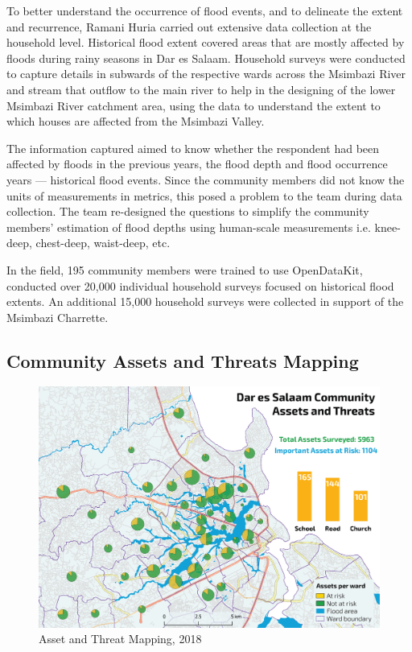 \documentclass[a4paper,12pt,twoside]{article}
\begin{document}
\begin{multicols}{2}
To better understand the occurrence of flood events, and to delineate the extent and recurrence, Ramani Huria carried out extensive data collection at the household level. Historical flood extent covered areas that are mostly affected by floods during rainy seasons in Dar es Salaam. Household surveys were conducted to capture details in subwards of the respective wards across the Msimbazi River and stream that outflow to the main river to help in the designing of the lower Msimbazi River catchment area, using the data to understand the extent to which houses are affected from the Msimbazi Valley.

The information captured aimed to know whether the respondent had been affected by floods in the previous years, the flood depth and flood occurrence years --- historical flood events. Since the community members did not know the units of measurements in metrics, this posed a problem to the team during data collection. The team re-designed the questions to simplify the community members’ estimation of flood depths using human-scale measurements i.e. knee-deep, chest-deep, waist-deep, etc.

In the field, 195 community members were trained to use OpenDataKit, conducted over 20,000 individual household surveys focused on historical flood extents. An additional 15,000 household surveys were collected in support of the Msimbazi Charrette. 
\end{multicols}

\newpage
\subsection{Community Assets and Threats Mapping}
\begin{figure}[h]
    \centering
    \includegraphics[width=.9\textwidth]{images/assets_map.png}
    \caption{Asset and Threat Mapping, 2018}
    \label{fig:my_label}
\end{figure}
\end{document}
